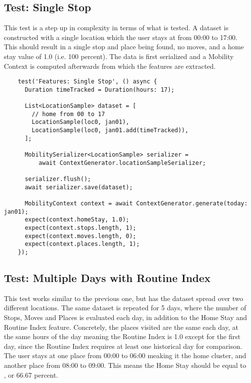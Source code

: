 \subsection{Test: Single Stop}
This test is a step up in complexity in terms of what is tested. A dataset is constructed with a single location which the user stays at from 00:00 to 17:00. This should result in a single stop and place being found, no moves, and a home stay value of 1.0 (i.e. 100 percent). The data is first serialized and a Mobility Context is computed afterwards from which the features are extracted.

\begin{verbatim}
    test('Features: Single Stop', () async {
      Duration timeTracked = Duration(hours: 17);

      List<LocationSample> dataset = [
        // home from 00 to 17
        LocationSample(loc0, jan01),
        LocationSample(loc0, jan01.add(timeTracked)),
      ];

      MobilitySerializer<LocationSample> serializer =
          await ContextGenerator.locationSampleSerializer;

      serializer.flush();
      await serializer.save(dataset);

      MobilityContext context = await ContextGenerator.generate(today: jan01);
      expect(context.homeStay, 1.0);
      expect(context.stops.length, 1);
      expect(context.moves.length, 0);
      expect(context.places.length, 1);
    });
\end{verbatim}

\subsection{Test: Multiple Days with Routine Index}
This test works similar to the previous one, but has the dataset spread over two different locations. The same dataset is repeated for 5 days, where the number of Stops, Moves and Places is evaluated each day, in addition to the Home Stay and Routine Index feature. Concretely, the places visited are the same each day, at the same hours of the day meaning the Routine Index is 1.0 except for the first day, since the Routine Index requires at least one historical day for comparison. The user stays at one place from 00:00 to 06:00 meaking it the home cluster, and another place from 08:00 to 09:00. This means the Home Stay should be equal to , or 66.67 percent. 

